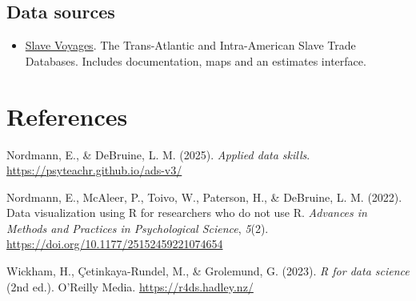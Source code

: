 \documentclass[
  english,
  letterpaper,
]{book}
\newlength{\cslhangindent}
\newenvironment{CSLReferences}[2] %
 {\begin{list}{}{%
  \setlength{\itemindent}{0pt}
  \setlength{\leftmargin}{0pt}
  \setlength{\parsep}{0pt}
  \ifodd #1
   \setlength{\leftmargin}{\cslhangindent}
   \setlength{\itemindent}{-1\cslhangindent}
  \fi
  \setlength{\itemsep}{#2\baselineskip}}}
 {\end{list}}
\providecommand{\tightlist}{%
  \setlength{\itemsep}{0pt}\setlength{\parskip}{0pt}}
\begin{document}
\section{Data sources}\label{data-sources}

\begin{itemize}
\tightlist
\item
  \href{https://www.slavevoyages.org/}{Slave Voyages}. The
  Trans-Atlantic and Intra-American Slave Trade Databases. Includes
  documentation, maps and an estimates interface.
\end{itemize}

\chapter*{References}\label{references}


\label{refs}
\begin{CSLReferences}{1}{0}
Nordmann, E., \& DeBruine, L. M. (2025). \emph{Applied data skills}.
\url{https://psyteachr.github.io/ads-v3/}

Nordmann, E., McAleer, P., Toivo, W., Paterson, H., \& DeBruine, L. M.
(2022). Data visualization using {R} for researchers who do not use {R}.
\emph{Advances in Methods and Practices in Psychological Science},
\emph{5}(2). \url{https://doi.org/10.1177/25152459221074654}

Wickham, H., Çetinkaya-Rundel, M., \& Grolemund, G. (2023). \emph{{R}
for data science} (2nd ed.). O'Reilly Media.
\url{https://r4ds.hadley.nz/}

\end{CSLReferences}


\backmatter
\end{document}
